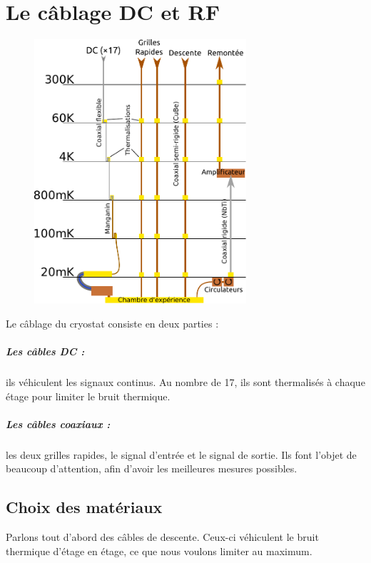 \documentclass[a4paper,11pt]{report}
\begin{document}
\chapter{Le câblage DC et RF}
\begin{figure}[h]
    \begin{center}
        \includegraphics[width=0.7\textwidth]{Images/Cablage_schema}
        \caption{}
        \label{fig:}
    \end{center}
\end{figure}

Le câblage du cryostat consiste en deux parties : 
\paragraph*{Les câbles DC : } ils véhiculent les signaux continus. Au nombre de 17, ils sont thermalisés à chaque étage pour limiter le bruit thermique.
\paragraph*{Les câbles coaxiaux : } les deux grilles rapides, le signal d'entrée et le signal de sortie. Ils font l'objet de beaucoup d'attention, afin d'avoir les meilleures mesures possibles.


\section{Choix des matériaux}
Parlons tout d'abord des câbles de descente. Ceux-ci véhiculent le bruit thermique d'étage en étage, ce que nous voulons limiter au maximum.
\end{document}
